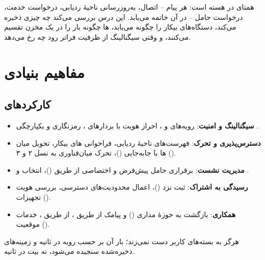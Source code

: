 \documentclass[11pt,a4paper]{article}
\begin{document}
 همتای  در هسته است: هر پیام  -- اتصال، به‌روزرسانی ناحیهٔ ردیابی، درخواست خدمت، درخواست
حامل -- در آن خاتمه می‌یابد. این درس بررسی می‌کند  چه چیزی ذخیره می‌کند، دستگاه‌های بیکار را چگونه می‌یابد،
ها چگونه بار را در یک مخزن تقسیم می‌کنند، و وقتی سیگنالینگ از ظرفیت فراتر رود چه رخ می‌دهد.

\section{مفاهیم بنیادی}

\subsection{کارکردهای }
\begin{itemize}
  \item \textbf{سیگنالینگ  و امنیت}: رویه‌های  و ، احراز هویت با بردارهای ، رمزنگاری و
        یکپارچگی  \cite{ts24301,ts33401}.
  \item \textbf{دسترس‌پذیری و تحرک}: فهرست‌های ناحیهٔ ردیابی، فراخوانی های بیکار، تحویل میان ها با جابه‌جایی
         ()، تحرک میان‌فناوری به نسل ۲ و ۳ ().
  \item \textbf{مدیریت نشست}: برقراری حامل پیش‌فرض و اختصاصی از طریق  ()، انتخاب  و .
  \item \textbf{رسیدگی به اشتراک}: ثبت نزد  ()، اعمال محدودیت‌های دسترسی، بررسی هویت تجهیزات ().
  \item \textbf{همکاری}: بازگشت به حوزهٔ مداری () و پیامک از طریق  \cite{ts23272}،  از طریق
         \cite{ts23216}، خدمات موقعیت ().
\end{itemize}
 هرگز به بسته‌های کاربر دست نمی‌زند؛ بار آن بر حسب رویه در ثانیه و زمینه‌های ذخیره‌شده سنجیده می‌شود، نه بیت
در ثانیه.
\end{document}
